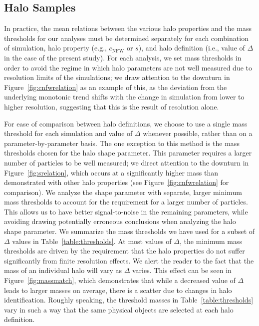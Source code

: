 \documentclass[usenatbib,fleqn]{mnras}
\begin{document}
\subsection{Halo Samples}

In practice, the mean relations between the various halo properties and the mass 
thresholds for our analyses must be determined separately for each combination of simulation, 
halo property (e.g., $c_{\mathrm{NFW}}$ or $s$), and halo definition (i.e., value of $\Delta$ in the case of the present study). 
For each analysis, we set mass thresholds in order to avoid the regime in which 
halo parameters are not well measured due to resolution limits of the simulations; 
we draw attention to the downturn in Figure~\ref{fig:cnfwrelation} as an example of this, 
as the deviation from the underlying monotonic trend shifts with the change in 
simulation from lower to higher resolution, suggesting that this is the result of resolution alone. 


For ease of comparison between halo definitions, we choose to use a single mass threshold for each
simulation and value of $\Delta$ whenever possible, rather than on a parameter-by-parameter basis. 
The one exception to this method is the mass thresholds chosen
for the halo shape parameter. This parameter requires a larger number of particles to be
well measured; we direct attention to the downturn in Figure~\ref{fig:srelation}, which occurs at
a significantly higher mass than demonstrated with other halo properties (see Figure~\ref{fig:cnfwrelation}
for comparison). We analyze the shape parameter with separate, larger minimum mass thresholds to account for 
the requirement for a larger number of particles. This allows us
to have better signal-to-noise in the remaining parameters, while avoiding drawing potentially
erroneous conclusions when analyzing the halo shape parameter.
We summarize the mass thresholds we have used for a 
subset of $\Delta$ values in Table~\ref{table:thresholds}. 
At most values of $\Delta$, the minimum mass thresholds are 
driven by the requirement that the halo properties do 
not suffer significantly from finite resolution effects. We alert the reader to the fact 
that the mass of an individual halo will vary as $\Delta$ varies. This effect can be seen in Figure~\ref{fig:massmatch}, which demonstrates that while a decreased value of $\Delta$ leads to larger masses on average, there is a scatter due to changes in halo identification. Roughly speaking, 
the threshold masses in Table~\ref{table:thresholds} vary in such a way that the 
same physical objects are selected at each halo definition.
\end{document}
